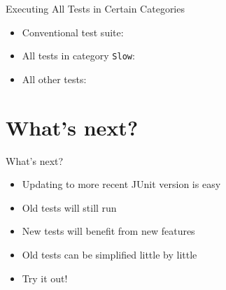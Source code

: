 \begin{frame}{Executing All Tests in Certain Categories}
	\begin{itemize}
		\item Conventional test suite:
		\item All tests in category \texttt{Slow}:
		\item All other tests:
	\end{itemize}
\end{frame}

{
\date{Quint Buchholz, Mann auf einer Leiter}
\part{What's next?}
}

\begin{frame}{What's next?}
	\begin{itemize}
		\item Updating to more recent JUnit version is easy
		\item Old tests will still run
		\item New tests will benefit from new features
		\item Old tests can be simplified little by little
		\item<alert@2> Try it out!
	\end{itemize}
\end{frame}

